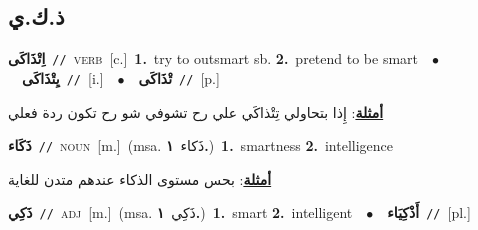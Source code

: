 \documentclass[10pt,a4paper,twoside]{article} %
\begin{document}
\begin{multicols}{2}
{{{{{\vspace{-3mm}
\subsection*{\color{blue}\foreignlanguage{arabic}{ذ.ك.ي}\color{blue}{}} 

{\setlength\topsep{0pt}\textbf{\foreignlanguage{arabic}{اِتْذَاكَى}}\ {\color{gray}\texttt{//}\color{black}}\ \textsc{verb}\ [c.]\ \textbf{1.}~try to outsmart sb.  \textbf{2.}~pretend to be smart\ \ $\bullet$\ \ \setlength\topsep{0pt}\textbf{\foreignlanguage{arabic}{يِتْذَاكَى}}\ {\color{gray}\texttt{//}\color{black}}\ [i.]\ \ $\bullet$\ \ \setlength\topsep{0pt}\textbf{\foreignlanguage{arabic}{تْذَاكَى}}\ {\color{gray}\texttt{//}\color{black}}\ [p.]\  \begin{flushright}\color{gray}\foreignlanguage{arabic}{\textbf{\underline{\foreignlanguage{arabic}{أمثلة}}}: إِذا بتحاولي تِتْذاكَي علي رح تشوفي شو رح تكون ردة فعلي}\end{flushright}\color{black}} \vspace{2mm}

{\setlength\topsep{0pt}\textbf{\foreignlanguage{arabic}{ذَكَاء}}\ {\color{gray}\texttt{//}\color{black}}\ \textsc{noun}\ [m.]\ \color{gray}(msa. \foreignlanguage{arabic}{ذَكاء}~\foreignlanguage{arabic}{\textbf{١.}})\color{black}\ \textbf{1.}~smartness  \textbf{2.}~intelligence\  \begin{flushright}\color{gray}\foreignlanguage{arabic}{\textbf{\underline{\foreignlanguage{arabic}{أمثلة}}}: بحس مستوى الذكاء عندهم متدن للغاية}\end{flushright}\color{black}} \vspace{2mm}

{\setlength\topsep{0pt}\textbf{\foreignlanguage{arabic}{ذَكِي}}\ {\color{gray}\texttt{//}\color{black}}\ \textsc{adj}\ [m.]\ \color{gray}(msa. \foreignlanguage{arabic}{ذَكِي}~\foreignlanguage{arabic}{\textbf{١.}})\color{black}\ \textbf{1.}~smart  \textbf{2.}~intelligent\ \ $\bullet$\ \ \setlength\topsep{0pt}\textbf{\foreignlanguage{arabic}{أَذْكِيَاء}}\ {\color{gray}\texttt{//}\color{black}}\ [pl.]\ 

}}}}}}
\end{multicols}
\end{document}
